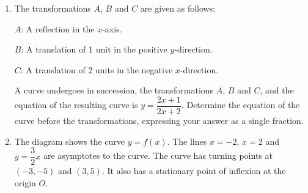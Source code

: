 \documentclass{echw}
\begin{document}
    \problem{}
        \begin{enumerate}
            \item The transformations $A$, $B$ and $C$ are given as follows:

            $A$: A reflection in the $x$-axis.

            $B$: A translation of 1 unit in the positive $y$-direction.

            $C$: A translation of 2 units in the negative $x$-direction.

            A curve undergoes in succession, the transformations $A$, $B$ and $C$, and the equation of the resulting curve is $y = \dfrac{2x+1}{2x+2}$. Determine the equation of the curve before the transformations, expressing your answer as a single fraction.
            \item The diagram shows the curve $y = f(x)$. The lines $x = -2$, $x = 2$ and $y = \dfrac32 x$ are asymptotes to the curve. The curve has turning points at $(-3, -5)$ and $(3, 5)$. It also has a stationary point of inflexion at the origin $O$.
            \begin{center}
\end{center}
\end{enumerate}
\end{document}

